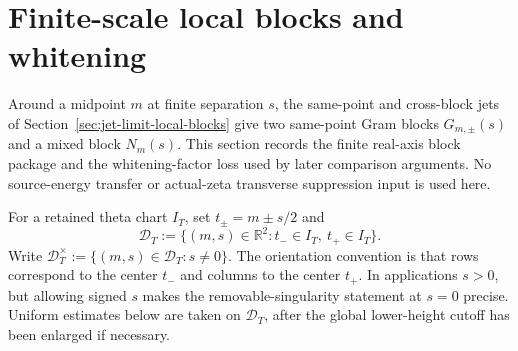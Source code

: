 %

\section{Finite-scale local blocks and whitening}
\label{sec:finite-scale-local-blocks-and-whitening}
\quad
{}\quad
{}\quad
{}\quad
{}\quad
{}
\par\medskip

Around a midpoint \(m\) at finite separation \(s\), the same-point and
cross-block jets of Section~\ref{sec:jet-limit-local-blocks} give two
same-point Gram blocks \(G_{m,\pm}(s)\) and a mixed block \(N_m(s)\).
This section records the finite real-axis block package and the
whitening-factor loss used by later comparison arguments.  No
source-energy transfer or actual-zeta transverse suppression input is
used here.

\begin{definition}
\label{def:finite-packet-domain}
For a retained theta chart \(I_T\), set \(t_\pm = m\pm s/2\) and
\[
        \mathcal D_T
        :=\bigl\{(m,s)\in\mathbb R^2 : t_-\in I_T,\ t_+\in I_T\bigr\}.
\]
Write \(\mathcal D_T^\times := \{(m,s)\in\mathcal D_T : s\ne 0\}\).
The orientation convention is that rows correspond to the center
\(t_-\) and columns to the center \(t_+\).  In applications \(s>0\),
but allowing signed \(s\) makes the removable-singularity statement at
\(s=0\) precise.  Uniform estimates below are taken on
\(\mathcal D_T\), after the global lower-height cutoff has been
enlarged if necessary.
\end{definition}

